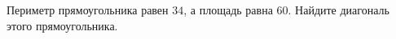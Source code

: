 \begin{ex}
	\begin{condition}
		 Периметр прямоугольника равен \( 34 \), а площадь равна \( 60 \). Найдите диагональ этого прямоугольника.
	\end{condition}
\end{ex}